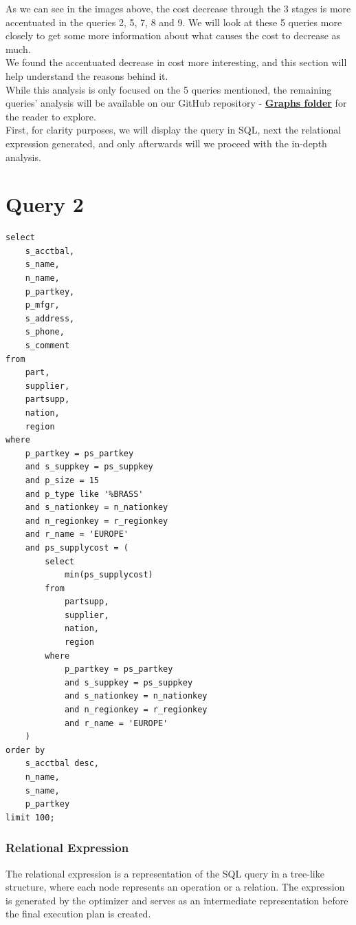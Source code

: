 \documentclass[a4paper,12pt]{scrreprt}
\begin{document}
As we can see in the images above, the cost decrease through the 3 stages is more accentuated in the queries 2, 5, 7, 8 and 9. We will look at these 5 queries more closely to get some more information about what causes the cost to decrease as much.\\

We found the accentuated decrease in cost more interesting, and this section will help understand the reasons behind it. \\

While this analysis is only focused on the 5 queries mentioned, the remaining queries' analysis will be available on our GitHub repository - \textbf{\href{https://github.com/Blackparkd/risinglight/tree/main/src/planner/outputs/graphs}{Graphs folder}} for the reader to explore. \\

First, for clarity purposes, we will display the query in SQL, next the relational expression generated, and only afterwards will we proceed with the in-depth analysis.

\section{Query 2}

\begin{lstlisting}
select
    s_acctbal,
    s_name,
    n_name,
    p_partkey,
    p_mfgr,
    s_address,
    s_phone,
    s_comment
from
    part,
    supplier,
    partsupp,
    nation,
    region
where
    p_partkey = ps_partkey
    and s_suppkey = ps_suppkey
    and p_size = 15
    and p_type like '%BRASS'
    and s_nationkey = n_nationkey
    and n_regionkey = r_regionkey
    and r_name = 'EUROPE'
    and ps_supplycost = (
        select
            min(ps_supplycost)
        from
            partsupp,
            supplier,
            nation,
            region
        where
            p_partkey = ps_partkey
            and s_suppkey = ps_suppkey
            and s_nationkey = n_nationkey
            and n_regionkey = r_regionkey
            and r_name = 'EUROPE'
    )
order by
    s_acctbal desc,
    n_name,
    s_name,
    p_partkey
limit 100;
\end{lstlisting}

\subsubsection{Relational Expression}

The relational expression is a representation of the SQL query in a tree-like structure, where each node represents an operation or a relation. The expression is generated by the optimizer and serves as an intermediate representation before the final execution plan is created.
\end{document}
